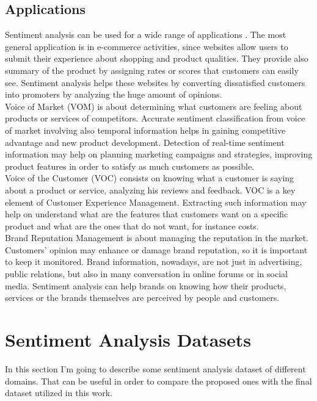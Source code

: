 \subsection{Applications}
Sentiment analysis can be used for a wide range of applications \cite{saifee2013applications}. The most general application is in e-commerce activities, since websites allow users to submit their experience about shopping and product qualities. They provide also summary of the product by assigning rates or scores that customers can easily see. Sentiment analysis helps these websites by converting dissatisfied customers into promoters by analyzing the huge amount of opinions.\\
Voice of Market (VOM) is about determining what customers are feeling about products or services of competitors. Accurate sentiment classification from voice of market involving also temporal information helps in gaining competitive advantage and new product development. Detection of real-time sentiment information may help on planning marketing campaigns and strategies, improving product features in order to satisfy as much customers as possible.\\
Voice of the Customer (VOC) consists on knowing what a customer is saying about a product or service, analyzing his reviews and feedback. VOC is a key element of Customer Experience Management. Extracting such information may help on understand what are the features that customers want on a specific product and what are the ones that do not want, for instance costs.\\
Brand Reputation Management is about managing the reputation in the market. Customers' opinion may enhance or damage brand reputation, so it is important to keep it monitored. Brand information, nowadays, are not just in advertising, public relations, but also in many conversation in online forums or in social media. Sentiment analysis can help brands on knowing how their products, services or the brands themselves are perceived by people and customers.





\section{Sentiment Analysis Datasets}
In this section I'm going to describe some sentiment analysis dataset of different domains. That can be useful in order to compare the proposed ones with the final dataset utilized in this work.


